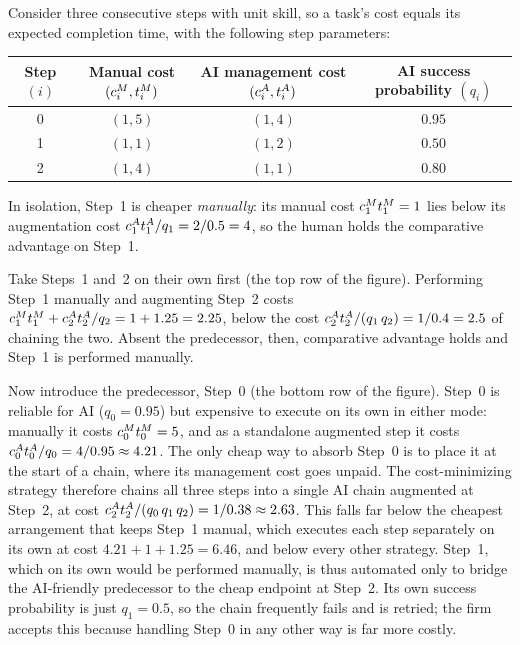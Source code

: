 \begin{example}
\label{ex:ca_predecessor}
Consider three consecutive steps with unit skill, so a task's cost equals its expected completion time, with the following step parameters:
\begin{center}
\begin{tabular}{c|ccc}
\toprule
\makecell{Step\\$(i)$} & \makecell{Manual cost\\$(c^{M}_{i}, t^{M}_{i})$} & \makecell{AI management cost\\$(c^{A}_{i}, t^{A}_{i})$} & \makecell{AI success probability\\$(q_i)$} \\
\midrule
0 & $(1, 5)$ & $(1, 4)$ & $0.95$ \\
1 & $(1, 1)$ & $(1, 2)$ & $0.50$ \\
2 & $(1, 4)$ & $(1, 1)$ & $0.80$ \\
\bottomrule
\end{tabular}
\end{center}

In isolation, Step~1 is cheaper \emph{manually}: its manual cost $c^{M}_{1}t^{M}_{1} = 1$ lies below its augmentation cost $c^{A}_{1}t^{A}_{1}/q_1 = 2/0.5 = 4$, so the human holds the comparative advantage on Step~1.

Take Steps~1 and~2 on their own first (the top row of the figure).
Performing Step~1 manually and augmenting Step~2 costs $c^{M}_{1}t^{M}_{1} + c^{A}_{2}t^{A}_{2}/q_2 = 1 + 1.25 = 2.25$, below the cost $c^{A}_{2}t^{A}_{2}/(q_1\, q_2) = 1/0.4 = 2.5$ of chaining the two.
Absent the predecessor, then, comparative advantage holds and Step~1 is performed manually.

Now introduce the predecessor, Step~0 (the bottom row of the figure).
Step~0 is reliable for AI ($q_0 = 0.95$) but expensive to execute on its own in either mode: manually it costs $c^{M}_{0}t^{M}_{0} = 5$, and as a standalone augmented step it costs $c^{A}_{0}t^{A}_{0}/q_0 = 4/0.95 \approx 4.21$.
The only cheap way to absorb Step~0 is to place it at the start of a chain, where its management cost goes unpaid.
The cost-minimizing strategy therefore chains all three steps into a single AI chain augmented at Step~2, at cost $c^{A}_{2}t^{A}_{2}/(q_0\, q_1\, q_2) = 1/0.38 \approx 2.63$.
This falls far below the cheapest arrangement that keeps Step~1 manual, which executes each step separately on its own at cost $4.21 + 1 + 1.25 = 6.46$, and below every other strategy.
Step~1, which on its own would be performed manually, is thus automated only to bridge the AI-friendly predecessor to the cheap endpoint at Step~2.
Its own success probability is just $q_1 = 0.5$, so the chain frequently fails and is retried; the firm accepts this because handling Step~0 in any other way is far more costly.
\end{example}

